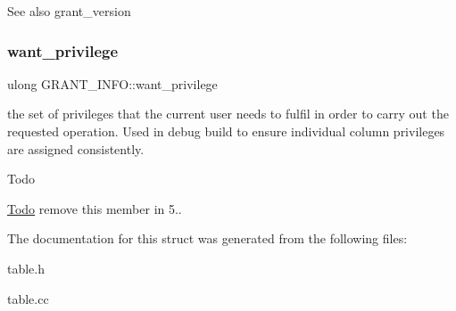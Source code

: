 \begin{DoxySeeAlso}{See also}
grant\+\_\+version 
\end{DoxySeeAlso}
\mbox{\label{structGRANT__INFO_afb32946497f7754ba60914d9fca5d616}} 
\subsubsection{\texorpdfstring{want\+\_\+privilege}{want\_privilege}}
{\footnotesize\ttfamily ulong G\+R\+A\+N\+T\+\_\+\+I\+N\+F\+O\+::want\+\_\+privilege}



the set of privileges that the current user needs to fulfil in order to carry out the requested operation. Used in debug build to ensure individual column privileges are assigned consistently. 

\begin{DoxyRefDesc}{Todo}
\item[\mbox{\hyperlink{todo__todo000130}{Todo}}]remove this member in 5.. \end{DoxyRefDesc}


The documentation for this struct was generated from the following files\+:\begin{DoxyCompactItemize}
\item 
table.\+h\item 
table.\+cc\end{DoxyCompactItemize}
